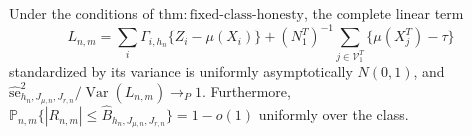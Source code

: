 Under the conditions of \(\mathrm{thm:fixed\text{-}class\text{-}honesty}\), the complete linear term
\[
 L_{n,m}=\sum_i\Gamma_{i,h_n}\{Z_i-\mu(X_i)\}
 +(N^T_1)^{-1}\sum_{j\in\mathcal V^T_1}\{\mu(X_j^T)-\tau\}
\]
standardized by its variance is uniformly asymptotically \(N(0,1)\), and \(\widehat{\mathrm{se}}_{h_n,J_{\mu,n},J_{r,n}}^2/\operatorname{Var}(L_{n,m})\to_P1\).  Furthermore, \(\mathbb P_{n,m}\{|R_{n,m}|\le\widehat B_{h_n,J_{\mu,n},J_{r,n}}\}=1-o(1)\) uniformly over the class.